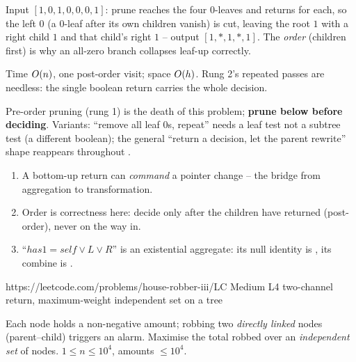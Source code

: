 \begin{tracebox}
Input $[1,0,1,0,0,0,1]$: prune reaches the four $0$-leaves and returns 
for each, so the left $0$ (a $0$-leaf after its own children vanish) is cut,
leaving the root $1$ with a right child $1$ and that child's right $1$ -- output
$[1,*,1,*,1]$. The \emph{order} (children first) is why an all-zero branch
collapses leaf-up correctly.
\end{tracebox}

\begin{complexitybox}
Time $O(n)$, one post-order visit; space $O(h)$. Rung 2's repeated passes
are needless: the single boolean return carries the whole decision.
\end{complexitybox}

\begin{warningbox}
Pre-order pruning (rung 1) is the death of this problem; \textbf{prune below
before deciding}. Variants: ``remove all leaf $0$s, repeat'' needs a leaf test
not a subtree test (a different boolean); the general ``return a decision, let
the parent rewrite'' shape reappears throughout .
\end{warningbox}

\begin{insightbox}
\begin{enumerate}[nosep, leftmargin=1.6em]
  \item A bottom-up return can \emph{command} a pointer change -- the bridge from
        aggregation to transformation.
  \item Order is correctness here: decide only after the children have returned
        (post-order), never on the way in.
  \item ``$\mathit{has1} = \mathit{self} \lor L \lor R$'' is an existential
        aggregate: its null identity is , its combine is \code{||}.
\end{enumerate}
\end{insightbox}


  {https://leetcode.com/problems/house-robber-iii/}{LC Medium L4}
  {two-channel return, maximum-weight independent set on a tree}

\begin{problemstatement}
Each node holds a non-negative amount; robbing two \emph{directly linked} nodes
(parent--child) triggers an alarm. Maximise the total robbed over an
\emph{independent set} of nodes. $1 \le n \le 10^{4}$, amounts $\le 10^{4}$.
\end{problemstatement}

